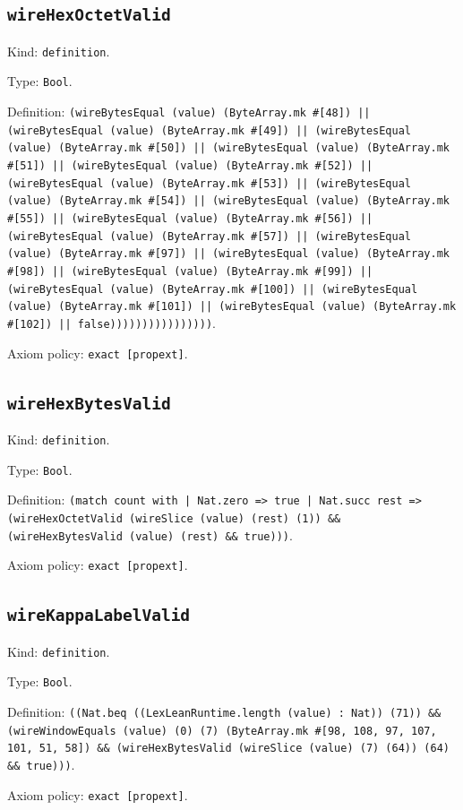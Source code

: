 \documentclass[11pt]{article}
\begin{document}
\subsection*{\texttt{wireHexOctetValid}}
\noindent Kind: \texttt{definition}.\par
\noindent Type: \texttt{Bool}.\par
\noindent Definition: \texttt{(wireBytesEqual (value) (ByteArray.mk \#[48]) || (wireBytesEqual (value) (ByteArray.mk \#[49]) || (wireBytesEqual (value) (ByteArray.mk \#[50]) || (wireBytesEqual (value) (ByteArray.mk \#[51]) || (wireBytesEqual (value) (ByteArray.mk \#[52]) || (wireBytesEqual (value) (ByteArray.mk \#[53]) || (wireBytesEqual (value) (ByteArray.mk \#[54]) || (wireBytesEqual (value) (ByteArray.mk \#[55]) || (wireBytesEqual (value) (ByteArray.mk \#[56]) || (wireBytesEqual (value) (ByteArray.mk \#[57]) || (wireBytesEqual (value) (ByteArray.mk \#[97]) || (wireBytesEqual (value) (ByteArray.mk \#[98]) || (wireBytesEqual (value) (ByteArray.mk \#[99]) || (wireBytesEqual (value) (ByteArray.mk \#[100]) || (wireBytesEqual (value) (ByteArray.mk \#[101]) || (wireBytesEqual (value) (ByteArray.mk \#[102]) || false))))))))))))))))}.\par
\noindent Axiom policy: \texttt{exact [propext]}.\par
\subsection*{\texttt{wireHexBytesValid}}
\noindent Kind: \texttt{definition}.\par
\noindent Type: \texttt{Bool}.\par
\noindent Definition: \texttt{(match count with | Nat.zero => true | Nat.succ rest => (wireHexOctetValid (wireSlice (value) (rest) (1)) \&\& (wireHexBytesValid (value) (rest) \&\& true)))}.\par
\noindent Axiom policy: \texttt{exact [propext]}.\par
\subsection*{\texttt{wireKappaLabelValid}}
\noindent Kind: \texttt{definition}.\par
\noindent Type: \texttt{Bool}.\par
\noindent Definition: \texttt{((Nat.beq ((LexLeanRuntime.length (value) : Nat)) (71)) \&\& (wireWindowEquals (value) (0) (7) (ByteArray.mk \#[98, 108, 97, 107, 101, 51, 58]) \&\& (wireHexBytesValid (wireSlice (value) (7) (64)) (64) \&\& true)))}.\par
\noindent Axiom policy: \texttt{exact [propext]}.\par
\end{document}
